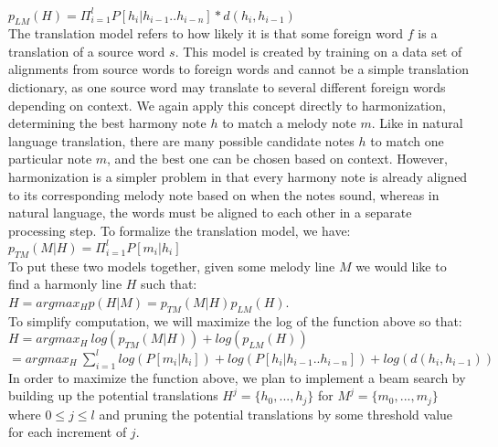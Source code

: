 \documentclass{sig-alternate}
\begin{document}
$p_{LM}(H) = \Pi_{i = 1}^{l} P[h_{i} | h_{i - 1} .. h_{i - n}] * d(h_{i}, h_{i-1})$\\

The translation model refers to how likely it is that some foreign word $f$ is
a translation of a source word $s$. This model is created by training on a data set of alignments from source words to foreign words and cannot be a simple translation dictionary, as one source word may translate to several different foreign words depending on
context. We again apply this concept directly to harmonization, determining the best harmony note $h$ to match a melody note $m$. Like in natural language translation, there are many possible candidate notes $h$ to match one particular note $m$, and the best one can be chosen based on context. However, harmonization is a simpler problem in that every harmony note is already aligned to its corresponding melody note based on when the notes sound, whereas in natural language, the words must be aligned to each other in a separate processing step. To formalize the translation model, we have:\\

$p_{TM}(M | H) = \Pi_{i = 1}^{l} P[m_{i} | h_{i}]$\\

To put these two models together, given some melody line $M$ we would like to find a harmonly line $H$ such that:\\

$H = argmax_{H}p(H | M) = p_{TM}(M | H)p_{LM}(H)$.\\

To simplify computation, we will maximize the log of the function above so that:\\

$H = argmax_{H}\ log(p_{TM}(M | H)) + log(p_{LM}(H))$\\

$= argmax_{H}\ \sum_{i = 1}^{l} log(P[m_{i} | h_{i}]) + log(P[h_{i} | h_{i - 1} .. h_{i - n}]) + log(d(h_{i}, h_{i-1}))$\\

In order to maximize the function above, we plan to implement a beam search by building up the potential translations $H^{j} = \{h_{0}, ... , h_{j}\}$ for $M^{j} = \{m_{0}, ... , m_{j}\}$ where $0 \leq j \leq l$ and pruning the potential translations by some threshold value for each increment of $j$.\\
\end{document}
